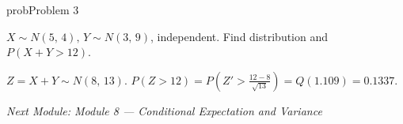 \begin{PSbox}[unbreakable]{prob}{Problem 3}

$X \sim N(5,\, 4),\, Y \sim N(3,\, 9)$, independent. Find distribution and $P(X + Y > 12)$.

\PSsolution{} $Z = X+Y \sim N(8,\, 13)$. $P(Z > 12) = P\left(Z' > \frac{12-8}{\sqrt{13}}\right) = Q(1.109) = 0.1337$.

\emph{Next Module: {Module 8 — Conditional Expectation and Variance}}

\end{PSbox}
